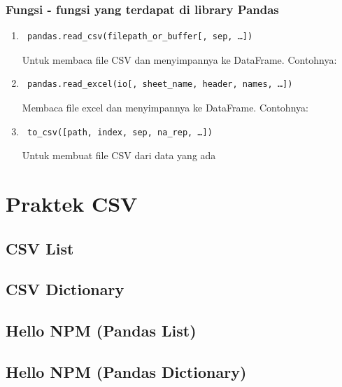 \subsubsection{Fungsi - fungsi yang terdapat di library Pandas}
\begin{enumerate}
 \item \begin{verbatim} pandas.read_csv(filepath_or_buffer[, sep, …]) \end{verbatim} Untuk membaca file CSV dan menyimpannya ke DataFrame. Contohnya: 
 \item \begin{verbatim} pandas.read_excel(io[, sheet_name, header, names, …])  \end{verbatim} Membaca file excel dan menyimpannya ke DataFrame. Contohnya: 
 \item \begin{verbatim} to_csv([path, index, sep, na_rep, …]) \end{verbatim}
	Untuk membuat file CSV dari data yang ada
\end{enumerate}

\section{Praktek CSV}
\subsection{CSV List}

\subsection{CSV Dictionary}

\subsection{Hello NPM (Pandas List)}

\subsection{Hello NPM (Pandas Dictionary)}

